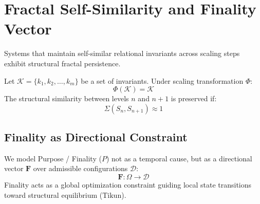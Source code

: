 \section{Fractal Self-Similarity and Finality Vector}
\label{sec:finality}

Systems that maintain self-similar relational invariants across scaling steps exhibit structural fractal persistence.

\begin{definition}
Let $\mathcal{K} = \{ k_1, k_2, \ldots, k_m \}$ be a set of invariants. Under scaling transformation $\Phi$:
\begin{equation}
\Phi(\mathcal{K}) = \mathcal{K}
\end{equation}
The structural similarity between levels $n$ and $n+1$ is preserved if:
\begin{equation}
\Sigma(S_n, S_{n+1}) \approx 1
\end{equation}
\end{definition}

\subsection{Finality as Directional Constraint}
We model Purpose / Finality ($P$) not as a temporal cause, but as a directional vector $\mathbf{F}$ over admissible configurations $\mathcal{D}$:
\begin{equation}
\mathbf{F} : \Omega \longrightarrow \mathcal{D}
\end{equation}
Finality acts as a global optimization constraint guiding local state transitions toward structural equilibrium ($\text{Tikun}$).
